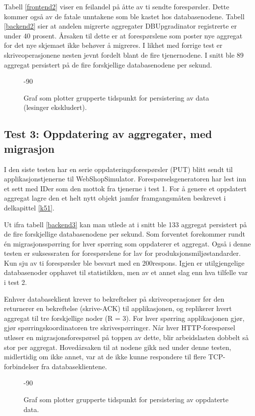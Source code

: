 Tabell \ref{frontend2} viser en feilandel på åtte av ti sendte forespørsler. Dette kommer også av de fatale unntakene som ble kastet hos databasenodene. Tabell \ref{backend2} sier at andelen migrerte aggregater DBUpgradinator registrerte er under 40 prosent. Årsaken til dette er at forespørslene som poster nye aggregat for det nye skjemaet ikke behøver å migreres. I likhet med forrige test er skriveoperasjonene nesten jevnt fordelt blant de fire tjenernodene. I snitt ble 89 aggregat persistert på de fire forskjellige databasenodene per sekund.

\begin{figure}[hbtp]
  \begin{turn}{-90}
    
  \end{turn}{-90}
  \caption{Graf som plotter grupperte tidspunkt for persistering av data (lesinger ekskludert).}
  \label{plott2}
\end{figure}

\subsection{Test 3: Oppdatering av aggregater, med migrasjon}

I den siste testen har en serie oppdateringsforespørsler (PUT) blitt sendt til applikasjonstjenerne til WebShopSimulator. Forespørsels\-generatoren har lest inn et sett med IDer som den mottok fra tjenerne i test 1. For å genere et oppdatert aggregat lagre den et helt nytt objekt jamfør framgangsmåten beskrevet i delkapittel \ref{k51}.




Ut ifra tabell \ref{backend3} kan man utlede at i snitt ble 133 aggregat persistert på de fire forskjellige databasenodene per sekund. Som forventet forekommer rundt én migrasjonsspørring for hver spørring som oppdaterer et aggregat. Også i denne testen er suksessraten for forespørslene for lav for produksjonsmiljø\-standarder. Kun sju av ti forespørsler ble besvart med en 200\-respons. Igjen er utilgjengelige databasenoder opphavet til statistikken, men av et annet slag enn hva tilfelle var i test 2.

Enhver databaseklient krever to bekreftelser på skriveoperasjoner før den returnerer en bekreftelse (skrive-ACK) til applikasjonen, og replikerer hvert aggregat til tre forskjellige noder (R = 3). For hver spørring applikasjonen gjør, gjør spørringskoordinatoren tre skrivespørringer. Når hver HTTP-forespørsel utløser en migrasjonsforespørsel på toppen av dette, blir arbeidslasten dobbelt så stor per aggregat. Hovedårsaken til at nodene gikk ned under denne testen, midlertidig om ikke annet, var at de ikke kunne respondere til flere TCP-forbindelser fra databaseklientene.

\begin{figure}[hbtp]
  \begin{turn}{-90}
    
  \end{turn}{-90}
  \caption{Graf som plotter grupperte tidspunkt for persistering av oppdaterte data.}
  \label{plott3}
\end{figure}


